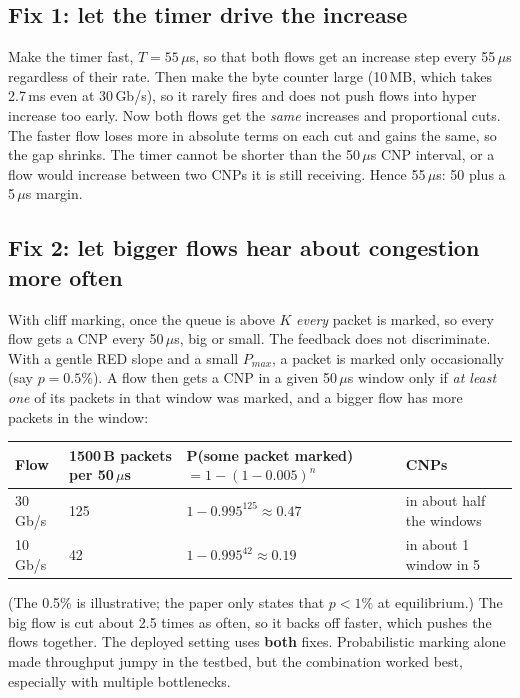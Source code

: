 \subsection{Fix 1: let the timer drive the increase}
Make the timer fast, $T = 55$\,$\mu$s, so that both flows get an increase step every 55\,$\mu$s regardless of their rate. Then make the byte
counter large (10\,MB, which takes 2.7\,ms even at 30\,Gb/s), so it rarely fires and does not push flows into hyper increase too early.
Now both flows get the \emph{same} increases and proportional cuts. The faster flow loses more in absolute terms on each cut and gains the same,
so the gap shrinks. The timer cannot be shorter than the 50\,$\mu$s CNP interval, or a flow would increase between two CNPs it is still
receiving. Hence 55\,$\mu$s: 50 plus a 5\,$\mu$s margin.

\subsection{Fix 2: let bigger flows hear about congestion more often}
With cliff marking, once the queue is above $K$ \emph{every} packet is marked, so every flow gets a CNP every 50\,$\mu$s, big or small. The
feedback does not discriminate. With a gentle RED slope and a small $P_{max}$, a packet is marked only occasionally (say $p = 0.5\%$). A flow
then gets a CNP in a given 50\,$\mu$s window only if \emph{at least one} of its packets in that window was marked, and a bigger flow has more
packets in the window:
\begin{center}
\begin{tabular}{@{}llll@{}}
\toprule
Flow & 1500\,B packets per 50\,$\mu$s & P(some packet marked) $= 1-(1-0.005)^{n}$ & CNPs\\
\midrule
30\,Gb/s & 125 & $1 - 0.995^{125} \approx 0.47$ & in about half the windows\\
10\,Gb/s & 42 & $1 - 0.995^{42} \approx 0.19$ & in about 1 window in 5\\
\bottomrule
\end{tabular}
\end{center}
(The 0.5\% is illustrative; the paper only states that $p < 1\%$ at equilibrium.) The big flow is cut about 2.5 times as often, so it
backs off faster, which pushes the flows together. The deployed setting uses \textbf{both} fixes. Probabilistic marking alone made throughput
jumpy in the testbed, but the combination worked best, especially with multiple bottlenecks.

